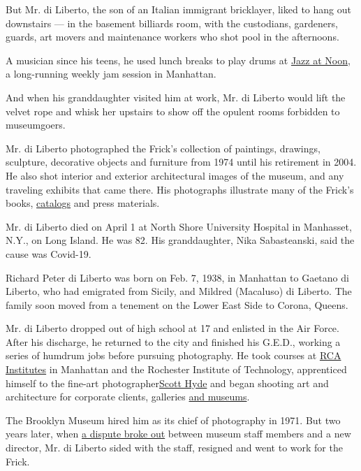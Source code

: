 But Mr. di Liberto, the son of an Italian immigrant bricklayer, liked to
hang out downstairs --- in the basement billiards room, with the
custodians, gardeners, guards, art movers and maintenance workers who
shot pool in the afternoons.

A musician since his teens, he used lunch breaks to play drums at
\href{https://cityroom.blogs.nytimes.com/2011/05/18/jazz-at-noon-is-closing-out-a-46-year-run/}{Jazz
at Noon}, a long-running weekly jam session in Manhattan.

And when his granddaughter visited him at work, Mr. di Liberto would
lift the velvet rope and whisk her upstairs to show off the opulent
rooms forbidden to museumgoers.

Mr. di Liberto photographed the Frick's collection of paintings,
drawings, sculpture, decorative objects and furniture from 1974 until
his retirement in 2004. He also shot interior and exterior architectural
images of the museum, and any traveling exhibits that came there. His
photographs illustrate many of the Frick's books,
\href{https://www.frick.org/shop/art_frick_collection/catalogue_volumes_v_and_vi}{catalogs}
and press materials.

Mr. di Liberto died on April 1 at North Shore University Hospital in
Manhasset, N.Y., on Long Island. He was 82. His granddaughter, Nika
Sabasteanski, said the cause was Covid-19.

Richard Peter di Liberto was born on Feb. 7, 1938, in Manhattan to
Gaetano di Liberto, who had emigrated from Sicily, and Mildred
(Macaluso) di Liberto. The family soon moved from a tenement on the
Lower East Side to Corona, Queens.

Mr. di Liberto dropped out of high school at 17 and enlisted in the Air
Force. After his discharge, he returned to the city and finished his
G.E.D., working a series of humdrum jobs before pursuing photography. He
took courses at
\href{https://www.nytimes.com/1973/08/14/archives/rca-school-here-plans-to-close-institute-cites-rise-in-costs-and.html}{RCA
Institutes} in Manhattan and the Rochester Institute of Technology,
apprenticed himself to the fine-art
photographer\href{https://www.mocp.org/detail.php?t=objects\&type=browse\&f=maker\&s=Hyde\%2C+Scott\&record=9}{Scott
Hyde} and began shooting art and architecture for corporate clients,
galleries
\href{nytimes.com/1971/05/09/archives/suffolk-buildings-1659-to-1971-are-shown-in-photos.html}{and
museums}.

The Brooklyn Museum hired him as its chief of photography in 1971. But
two years later, when
\href{https://www.nytimes.com/1973/11/27/archives/brooklyn-museum-split-over-policies-of-director-brooklyn-museum.html}{a
dispute broke out} between museum staff members and a new director, Mr.
di Liberto sided with the staff, resigned and went to work for the
Frick.

